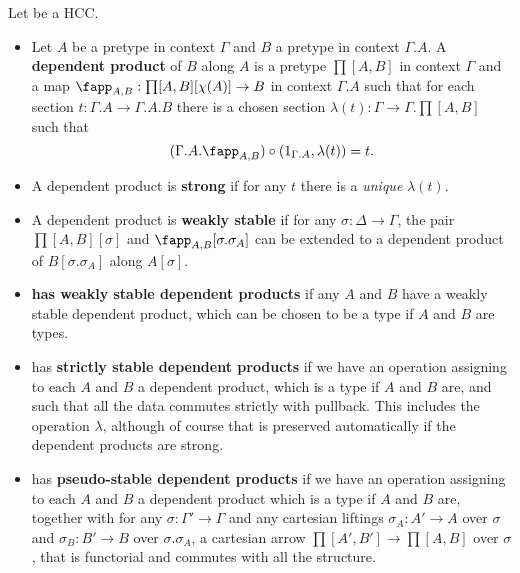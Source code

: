 \documentclass{amsart}
\begin{document}
\begin{defn}
  Let \E be a HCC.
  \begin{itemize}
  \item Let $A$ be a pretype in context $\Gamma$ and $B$ a pretype in context $\Gamma.A$.
    A \textbf{dependent product} of $B$ along $A$ is a pretype $\prod[A,B]$ in context $\Gamma$ and a map $\fapp_{A,B} : \prod[A,B][\chi(A)] \to B$ in context $\Gamma.A$ such that for each section $t:\Gamma.A \to \Gamma.A.B$ there is a chosen section $\lambda(t):\Gamma \to \Gamma.\prod[A,B]$ such that
    \[(\Gamma.A.\fapp_{A,B})\circ (1_{\Gamma.A},\lambda(t)) = t.\]
  \item A dependent product is \textbf{strong} if for any $t$ there is a \emph{unique} $\lambda(t)$.
  \item A dependent product is \textbf{weakly stable} if for any $\sigma:\Delta\to\Gamma$, the pair $\prod[A,B][\sigma]$ and $\fapp_{A,B}[\sigma.\sigma_A]$ can be extended to a dependent product of $B[\sigma.\sigma_A]$ along $A[\sigma]$.
  \item \E \textbf{has weakly stable dependent products} if any $A$ and $B$ have a weakly stable dependent product, which can be chosen to be a type if $A$ and $B$ are types.
  \item \E has \textbf{strictly stable dependent products} if we have an operation assigning to each $A$ and $B$ a dependent product, which is a type if $A$ and $B$ are, and such that all the data commutes strictly with pullback.
    This includes the operation $\lambda$, although of course that is preserved automatically if the dependent products are strong.
  \item \E has \textbf{pseudo-stable dependent products} if we have an operation assigning to each $A$ and $B$ a dependent product which is a type if $A$ and $B$ are, together with for any $\sigma:\Gamma'\to\Gamma$ and any cartesian liftings $\sigma_A: A' \to A$ over $\sigma$ and $\sigma_B: B'\to B$ over $\sigma.\sigma_A$, a cartesian arrow $\prod[A',B'] \to \prod[A,B]$ over $\sigma$, that is functorial and commutes with all the structure.
  \end{itemize}
\end{defn}
\end{document}
